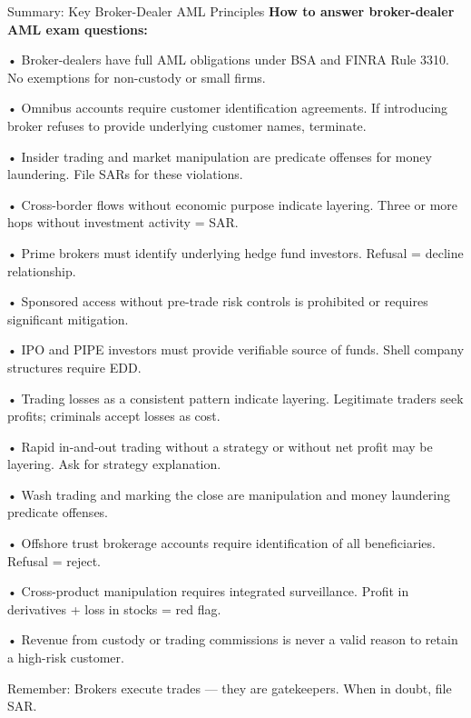 \documentclass[11pt,a4paper]{beamer}
\begin{document}
\begin{frame}{Summary: Key Broker-Dealer AML Principles}
\tiny
\noindent\textbf{How to answer broker-dealer AML exam questions:}

\vspace{0.1cm}
\noindent• Broker-dealers have full AML obligations under BSA and FINRA Rule 3310. No exemptions for non-custody or small firms.

\vspace{0.1cm}
\noindent• Omnibus accounts require customer identification agreements. If introducing broker refuses to provide underlying customer names, terminate.

\vspace{0.1cm}
\noindent• Insider trading and market manipulation are predicate offenses for money laundering. File SARs for these violations.

\vspace{0.1cm}
\noindent• Cross-border flows without economic purpose indicate layering. Three or more hops without investment activity = SAR.

\vspace{0.1cm}
\noindent• Prime brokers must identify underlying hedge fund investors. Refusal = decline relationship.

\vspace{0.1cm}
\noindent• Sponsored access without pre-trade risk controls is prohibited or requires significant mitigation.

\vspace{0.1cm}
\noindent• IPO and PIPE investors must provide verifiable source of funds. Shell company structures require EDD.

\vspace{0.1cm}
\noindent• Trading losses as a consistent pattern indicate layering. Legitimate traders seek profits; criminals accept losses as cost.

\vspace{0.1cm}
\noindent• Rapid in-and-out trading without a strategy or without net profit may be layering. Ask for strategy explanation.

\vspace{0.1cm}
\noindent• Wash trading and marking the close are manipulation and money laundering predicate offenses.

\vspace{0.1cm}
\noindent• Offshore trust brokerage accounts require identification of all beneficiaries. Refusal = reject.

\vspace{0.1cm}
\noindent• Cross-product manipulation requires integrated surveillance. Profit in derivatives + loss in stocks = red flag.

\vspace{0.1cm}
\noindent• Revenue from custody or trading commissions is never a valid reason to retain a high-risk customer.

\vspace{0.3cm}
\centering
{Remember: Brokers execute trades — they are gatekeepers. When in doubt, file SAR.}
\end{frame}
\end{document}
